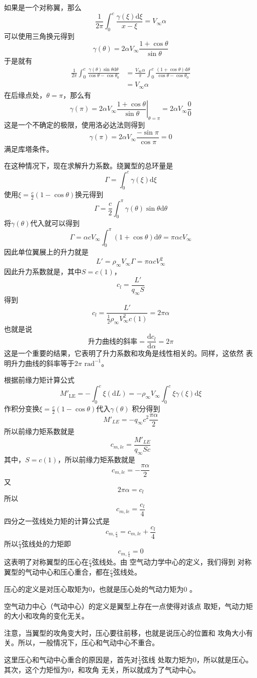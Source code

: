 如果是一个对称翼，那么
\[
  \frac{1}{2\pi}\int _0^c \frac{\gamma(\xi)\mathrm{d}\xi}{x-\xi}=V_\infty \alpha
\]
可以使用三角换元得到
\[
  \gamma(\theta)=2\alpha V_\infty \frac{1+\cos \theta}{\sin \theta}
\]
于是就有
\[
  \begin{split}
    \frac{1}{2\pi}\int _0^c \frac{\gamma(\theta)\sin  \theta \mathrm{d}\theta}{\cos \theta -\cos \theta_0}
    &=\frac{V_\infty \alpha}{\pi}\int _0^c \frac{(1+\cos \theta)\mathrm{d}\theta}{\cos \theta -\cos \theta_0}\\ 
    &=V_\infty \alpha
  \end{split}
\]
在后缘点处，$\theta=\pi$，那么有
\[
  \gamma(\pi)=2\alpha V_\infty \left.\frac{1+\cos \theta}{\sin \theta}\right| _{\theta=\pi}=
    2\alpha V_\infty \frac{0}{0}
\]
这是一个不确定的极限，使用洛必达法则得到
\[
  \gamma(\pi)=2\alpha V_\infty \frac{-\sin \pi}{\cos \pi}=0 
\]
满足库塔条件。

在这种情况下，现在求解升力系数。绕翼型的总环量是
\[
  \Gamma=\int _0 ^c \gamma(\xi)\mathrm{d}\xi 
\]
使用$\xi=\frac{c}{2 }(1-\cos \theta)$换元得到
\[
  \Gamma=\frac{c}{2}\int _0^\pi \gamma(\theta)\sin \theta \mathrm{d} \theta
\]
将$\gamma(\theta)$代入就可以得到
\[
  \Gamma=\alpha c V_\infty \int_0^\pi (1+\cos \theta)\mathrm{d}\theta =\pi \alpha c V_\infty 
\]
因此单位翼展上的升力就是
\[
  L'=\rho _\infty V_\infty \Gamma =\pi \alpha c V_\infty^2 
\]
因此升力系数就是，其中$S=c(1)$，
\[
  c_l=\frac{L'}{q_\infty S}
\]
得到
\[
  c_l=\frac{L'}{\frac{1}{2}\rho_\infty V_\infty^2 c(1)}=2\pi \alpha
\]
也就是说
\[
  升力曲线的斜率=\frac{\mathrm{d}c_l}{\mathrm{d}\alpha}=2\pi
\]
这是一个重要的结果，它表明了升力系数和攻角是线性相关的。同样，这依然
表明升力曲线的斜率等于$2\pi \,\,\mathrm{rad}^{-1}$。

根据前缘力矩计算公式
\[
  M'_{\mathrm{LE}}=-\int _0^c \xi (\mathrm{d}L)=
  -\rho_\infty V_\infty \int _0^c \xi \gamma(\xi)\mathrm{d}\xi
\]
作积分变换$\xi=\frac{c}{2}(1-\cos \theta)$代入$\gamma(\theta)$
积分得到
\[
  M'_{LE}=-q_\infty c^2 \frac{\pi \alpha}{2}
\]
所以前缘力矩系数就是
\[
  c_{m,le}=\frac{M'_{LE}}{q_\infty S c}
\]
其中，$S=c(1)$，所以前缘力矩系数就是
\[
  c_{m,le}=-\frac{\pi \alpha}{2}
\]
又
\[
  2\pi \alpha =c_l
\]
所以
\[
  c_{m,le}=\frac{c_l}{4}
\]
四分之一弦线处力矩的计算公式是
\[
  c_{m,\frac{c}{4}}=c_{m,le}+\frac{c_l}{4}
\]
所以$\frac{c}{4}$弦线处的力矩即
\[
  c_{m,\frac{c}{4}}=0
\]
这表明了{\color{noteorange}对称翼型的压心在$\frac{c}{4}$弦线处}。由
空气动力学中心的定义，我们得到
{\color{noteorange}对称翼型的气动中心和压心重合，都在$\frac{c}{4}$弦线处}。
\begin{notice}
压心的定义是对压心取矩为0，也就是压心处的气动力矩为0 。

空气动力中心（气动中心）的定义是翼型上存在一点使得对该点
取矩，气动力矩的大小和攻角的变化无关。

注意，当翼型的攻角变大时，压心要往前移，也就是说压心的位置和
攻角大小有关。所以，一般情况下，压心和气动中心不重合。

这里压心和气动中心重合的原因是，首先对$\frac{1}{4 }$弦线
处取力矩为0，所以就是压心。其次，这个力矩恒为0，和攻角
无关，所以就成为了气动中心。
\end{notice}

